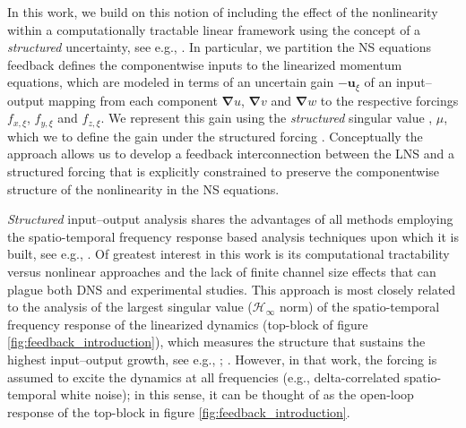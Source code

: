In this work, we build on this notion of including the effect of the nonlinearity within a computationally tractable linear framework using the concept of a \emph{structured} uncertainty, see e.g., \citep{packard1993complex,zhou1996robust}. In particular, we partition the NS equations   feedback defines the componentwise inputs to the linearized momentum equations, which are modeled in terms of an uncertain gain $-\boldsymbol{u}_{\xi}$ of an input--output mapping from each component $\boldsymbol{\nabla} u$, $\boldsymbol{\nabla} v$ and $\boldsymbol{\nabla} w$ to the respective forcings $f_{x,\xi}$, $f_{y,\xi}$ and $f_{z,\xi}$.  We represent this gain using the \emph{structured} singular value \citep{doyle1982analysis,safonov1982stability},  $\mu$, which we  to define the  gain under the structured forcing \citep{packard1993complex}. Conceptually the approach allows us to develop a feedback interconnection between the LNS and a structured forcing that is explicitly constrained to preserve the componentwise structure of the nonlinearity in the NS equations. 

 \emph{Structured} input--output analysis shares the advantages of all methods employing the spatio-temporal frequency response based analysis techniques upon which it is built, see e.g., \citep{Farrell1993, Bamieh2001,Jovanovic2005,McKeon2010,mckeon2013experimental,mckeon2017engine,illingworth2018estimating,vadarevu2019coherent,madhusudanan2019coherent,symon2021energy,liu2019vorticity,liu2019input}. Of greatest interest in this work is its computational tractability versus nonlinear approaches and the lack of finite channel size effects that can plague both DNS and experimental studies. This approach is most closely related to the analysis of the largest singular value ($\mathcal{H}_\infty$ norm) of the spatio-temporal frequency response of the linearized dynamics (top-block of figure \ref{fig:feedback_introduction}), which measures the structure that sustains the highest input--output growth, see e.g., \citet[chapter 8.1.2]{jovanovic2004modeling}; \citet{schmid2007nonmodal,hwang2010amplification,Hwang2010Linear,illingworth2020streamwise}. However, in that work, the forcing is assumed to excite the
dynamics at all frequencies (e.g., delta-correlated spatio-temporal white noise); in this sense, it can be thought of as the open-loop response of the top-block in figure \ref{fig:feedback_introduction}.






